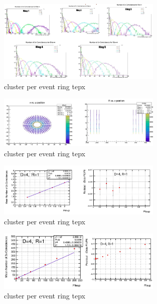 \begin{figure}[!htp]
\centering
\includegraphics[width=0.7\textwidth]{ashish_thesis/twofoldcoin_D4_allring (1).png}
\caption{%
  cluster per event ring tepx 
}
\label{fig:cluster_ring}
\end{figure}


\begin{figure}[!htp]
\centering
\includegraphics[width=0.7\textwidth]{ashish_thesis/twofold_geometry_pu30.png}
\caption{%
  cluster per event ring tepx 
}
\label{fig:cluster_ring}
\end{figure}



\begin{figure}[!htp]
\centering
\includegraphics[width=0.7\textwidth]{ashish_thesis/lowpufit_twofold_D4R1.png}
\caption{%
  cluster per event ring tepx 
}
\label{fig:cluster_ring}
\end{figure}



\begin{figure}[!htp]
\centering
\includegraphics[width=0.7\textwidth]{ashish_thesis/twofoldcoincidences_extrapolation_D4R1.png}
\caption{%
  cluster per event ring tepx 
}
\label{fig:cluster_ring}
\end{figure}


